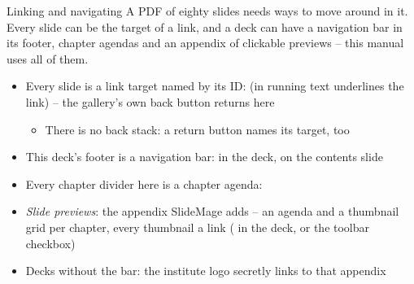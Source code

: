 
\begin{standardframe}{Linking and navigating}
	\small
	A PDF of eighty slides needs ways to move around in it. Every slide can be
	the target of a link, and a deck can have a navigation bar in its footer,
	chapter agendas and an appendix of clickable previews -- this manual uses
	all of them.
	\par\medskip
	\begin{itemize}
		\item Every slide is a link target named by its ID:  (in running text  underlines the link) \hyperlink{1td}{} -- the gallery's own back button returns here
		\begin{itemize}
			\item There is no back stack: a return button names its target, too
		\end{itemize}
		\item This deck's footer is a navigation bar: \SMCode{[...]} in the deck,  on the contents slide
		\item Every chapter divider here is a chapter agenda: 
		\item \emph{Slide previews}: the appendix SlideMage adds -- an agenda and a thumbnail grid per chapter, every thumbnail a link ( in the deck, or the toolbar checkbox)
		\item Decks without the bar: the institute logo secretly links to that appendix
	\end{itemize}
\end{standardframe}
